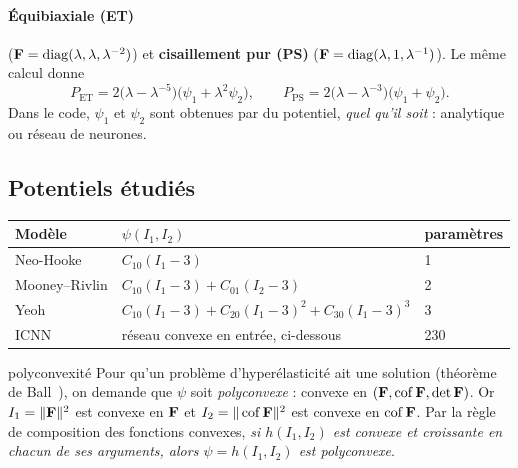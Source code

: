 \paragraph{Équibiaxiale (ET)} ($\mathbf{F}=\mathrm{diag}(\lambda,\lambda,\lambda^{-2})$) et \textbf{cisaillement pur (PS)} ($\mathbf{F}=\mathrm{diag}(\lambda,1,\lambda^{-1})$). Le même calcul donne
\begin{equation}
P_{\mathrm{ET}} = 2\big(\lambda-\lambda^{-5}\big)\big(\psi_1+\lambda^2\psi_2\big),\qquad P_{\mathrm{PS}} = 2\big(\lambda-\lambda^{-3}\big)\big(\psi_1+\psi_2\big).
\end{equation}
Dans le code, $\psi_1$ et $\psi_2$ sont obtenues par  du potentiel, \emph{quel qu'il soit} : analytique ou réseau de neurones.

\subsection{Potentiels étudiés}

\begin{center}
\begin{tabular}{lll}
\toprule
Modèle & $\psi(I_1,I_2)$ & paramètres\\
\midrule
Neo-Hooke & $C_{10}(I_1-3)$ & 1\\
Mooney--Rivlin & $C_{10}(I_1-3)+C_{01}(I_2-3)$ & 2\\
Yeoh~\cite{yeoh1993} & $C_{10}(I_1-3)+C_{20}(I_1-3)^2+C_{30}(I_1-3)^3$ & 3\\
ICNN & réseau convexe en entrée, ci-dessous & 230\\
\bottomrule
\end{tabular}
\end{center}

\begin{rappel}{polyconvexité}
Pour qu'un problème d'hyperélasticité ait une solution (théorème de Ball~\cite{ball1977}), on demande que $\psi$ soit \emph{polyconvexe} : convexe en $(\mathbf{F},\operatorname{cof}\mathbf{F},\det\mathbf{F})$. Or $I_1=\|\mathbf{F}\|^2$ est convexe en $\mathbf{F}$ et $I_2=\|\operatorname{cof}\mathbf{F}\|^2$ est convexe en $\operatorname{cof}\mathbf{F}$. Par la règle de composition des fonctions convexes, \emph{si $h(I_1,I_2)$ est convexe et croissante en chacun de ses arguments, alors $\psi=h(I_1,I_2)$ est polyconvexe}.
\end{rappel}


